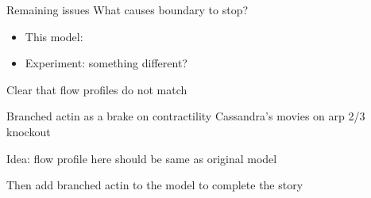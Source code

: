 \documentclass{beamer}
\newcommand{\6}[1]{#1_{\text{6}}}
\newcommand{\3}[1]{#1_{\text{3}}}
\begin{document}
\begin{frame}{Remaining issues}
What causes boundary to stop?
\begin{itemize}
\item This model: 
\item Experiment: something different?
\end{itemize}
Clear that flow profiles do not match
\end{frame}

\begin{frame}{Branched actin as a brake on contractility}
Cassandra's movies on arp 2/3 knockout

Idea: flow profile here should be same as original model

Then add branched actin to the model to complete the story

\end{frame}



\iffalse
\begin{frame}{Computational rheology in dynamic cross-linked networks}
\centering
\movie[width=0.48\textwidth]{
 \texttt{[image: RelaxationTurnover5\_478.png]}
}{ShearTurnover5.mp4}
\movie[width=0.48\textwidth]{
 \texttt{[image: RelaxationTurnover10\_478.png]}
}{ShearTurnover10.mp4}
\newline \phantom{x} \qquad $\tau_f/\tau_c \approx 0.3$ \qquad \qquad \qquad \qquad \quad $\tau_f/\tau_c \approx 0.7$ 
\newline ``Meshwork'' \qquad \qquad \qquad \qquad \quad ``B-In-M''
\end{frame}
\fi
\end{document}

